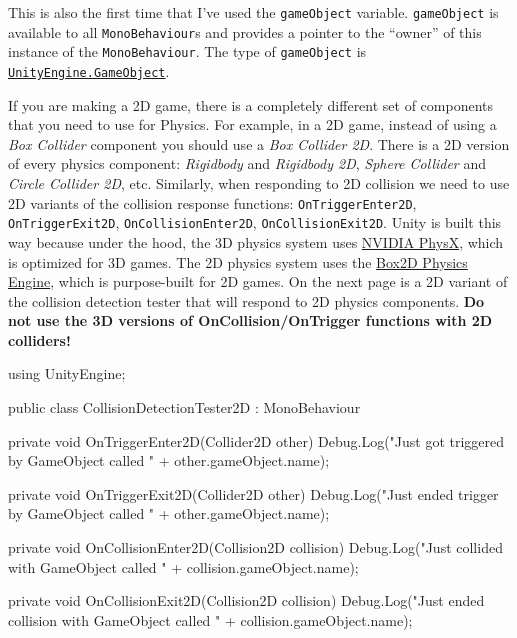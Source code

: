 \documentclass[11pt]{article}
\def\StartLineAt#1{\lstset{firstnumber=#1}}
\begin{document}
\begin{center}
\end{center}

This is also the first time that I've used the \lstinline|gameObject| variable.  \lstinline|gameObject|
is available to all \lstinline|MonoBehaviour|s and provides a pointer to the ``owner'' of this instance
of the \lstinline|MonoBehaviour|.  The type of \lstinline|gameObject| is 
\href{https://docs.unity3d.com/ScriptReference/GameObject.html}{\lstinline|UnityEngine.GameObject|}.

If you are making a 2D game, there is a completely different set of components that you need to use
for Physics.  For example, in a 2D game, instead of using a \textit{Box Collider} component you should
use a \textit{Box Collider 2D}.  There is a 2D version of every physics component: \textit{Rigidbody}
and \textit{Rigidbody 2D}, \textit{Sphere Collider} and \textit{Circle Collider 2D}, etc.  Similarly,
when responding to 2D collision we need to use 2D variants of the collision response functions:
\lstinline|OnTriggerEnter2D|, \lstinline|OnTriggerExit2D|, \lstinline|OnCollisionEnter2D|,
\lstinline|OnCollisionExit2D|.  Unity is built this way because under the hood, the 3D physics system
uses \href{https://www.geforce.com/hardware/technology/physx}{NVIDIA PhysX}, which is optimized for
3D games.  The 2D physics system uses the \href{https://github.com/erincatto/box2d}{Box2D Physics Engine},
which is purpose-built for 2D games.  On the next page is a 2D variant of the collision detection 
tester that will respond to 2D physics components.  \textbf{Do not use the 3D versions of 
OnCollision/OnTrigger functions with 2D colliders!}\pagebreak

\StartLineAt{1}
\begin{csharp}
using UnityEngine;

public class CollisionDetectionTester2D : MonoBehaviour
{
    private void OnTriggerEnter2D(Collider2D other)
    {
        Debug.Log("Just got triggered by GameObject called " + other.gameObject.name);
    }

    private void OnTriggerExit2D(Collider2D other)
    {
        Debug.Log("Just ended trigger by GameObject called " + other.gameObject.name);
    }

    private void OnCollisionEnter2D(Collision2D collision)
    {
        Debug.Log("Just collided with GameObject called " + collision.gameObject.name);
    }

    private void OnCollisionExit2D(Collision2D collision)
    {
        Debug.Log("Just ended collision with GameObject called " + collision.gameObject.name);
    }
}
\end{csharp}
\end{document}

